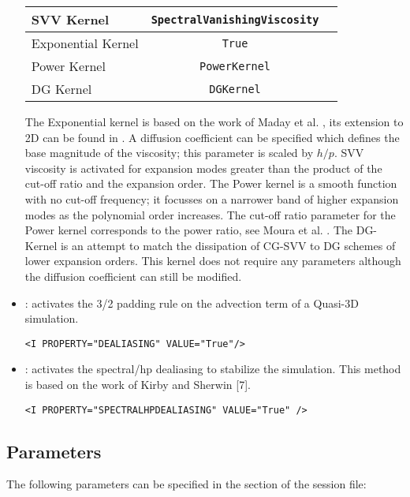 \begin{itemize}
\begin{center}
\footnotesize
\begin{tabular}{lcc}
\toprule
{SVV Kernel} & {\texttt{SpectralVanishingViscosity}} \\
\midrule
Exponential Kernel & \texttt{True} \\
Power Kernel & \texttt{PowerKernel} \\
DG Kernel & \texttt{DGKernel} \\
\bottomrule
\end{tabular}
\end{center}

The Exponential kernel is based on the work of Maday et al. \cite{yvsiouei93},
its extension to 2D can be found in \cite{rosh06}. A diffusion coefficient can
be specified which defines the base magnitude of the viscosity; this parameter
is scaled by $h/p$. SVV viscosity is activated for expansion modes greater than
the product of the cut-off ratio and the expansion order. The Power kernel is a
smooth function with no cut-off frequency; it focusses on a narrower band of
higher expansion modes as the polynomial order increases. The cut-off ratio
parameter for the Power kernel corresponds to the power ratio, see Moura et al.
\cite{rospjo16}. The DG-Kernel is an attempt to match the dissipation of CG-SVV
to DG schemes of lower expansion orders. This kernel does not require any parameters
although the diffusion coefficient can still be modified.   

\item {}: activates the 3/2 padding rule on the advection term
of a Quasi-3D simulation.
\begin{lstlisting}[style=XMLStyle]
<I PROPERTY="DEALIASING" VALUE="True"/>
\end{lstlisting}


\item {}: activates the spectral/hp dealiasing to
stabilize the simulation. This method is based on the work of Kirby and Sherwin [7].
\begin{lstlisting}[style=XMLStyle]
<I PROPERTY="SPECTRALHPDEALIASING" VALUE="True" />
\end{lstlisting}

\end{itemize}

\subsection{Parameters}
The following parameters can be specified in the  section of
the session file:

